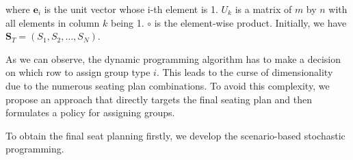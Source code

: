 where $\mathbf{e}_{i}$ is the unit vector whose i-th element is 1. $U_k$ is a matrix of $m$ by $n$ with all elements in column $k$ being 1. $\circ$ is the element-wise product. Initially, we have $\mathbf{S}_{T} = (S_1, S_2, \ldots, S_{N})$. 


As we can observe, the dynamic programming algorithm has to make a decision on which row to assign group type $i$. This leads to the curse of dimensionality due to the numerous seating plan combinations. To avoid this complexity, we propose an approach that directly targets the final seating plan and then formulates a policy for assigning groups.

To obtain the final seat planning firstly, we develop the scenario-based stochastic programming.








